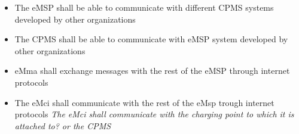 \begin{itemize}
    \item The eMSP shall be able to communicate with different CPMS systems developed by other organizations
    \item The CPMS shall be able to communicate with eMSP system developed by other organizations
    \item eMma shall exchange messages with the rest of the eMSP through internet protocols
    \item The eMci shall communicate with the rest of the eMsp trough internet protocols
    \textit{The eMci shall communicate with the charging point to which it is attached to? or the CPMS}
\end{itemize}

